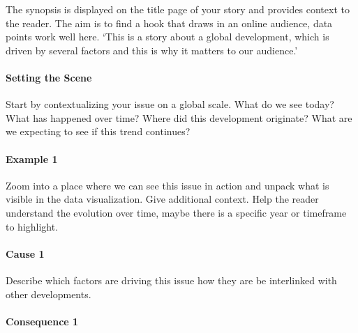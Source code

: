 \documentclass[
]{book}
\renewenvironment{quote}{\begin{VF}}{\end{VF}}
\begin{document}
\begin{quote}
The synopsis is displayed on the title page of your story and provides context to the reader. The aim is to find a hook that draws in an online audience, data points work well here. `This is a story about a global development, which is driven by several factors and this is why it matters to our audience.'
\end{quote}

\hypertarget{setting-the-scene}{%
\paragraph*{Setting the Scene}\label{setting-the-scene}}

\begin{quote}
Start by contextualizing your issue on a global scale. What do we see today? What has happened over time? Where did this development originate? What are we expecting to see if this trend continues?
\end{quote}

\hypertarget{example-1}{%
\paragraph*{Example 1}\label{example-1}}

\begin{quote}
Zoom into a place where we can see this issue in action and unpack what is visible in the data visualization. Give additional context. Help the reader understand the evolution over time, maybe there is a specific year or timeframe to highlight.
\end{quote}

\hypertarget{cause-1}{%
\paragraph*{Cause 1}\label{cause-1}}

\begin{quote}
Describe which factors are driving this issue how they are be interlinked with other developments.
\end{quote}

\hypertarget{consequence-1}{%
\paragraph*{Consequence 1}\label{consequence-1}}
\end{document}
